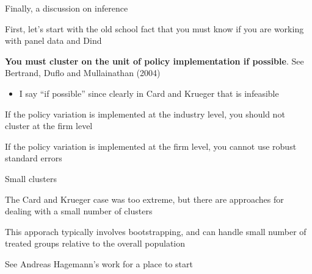 \documentclass[notes,11pt, aspectratio=169]{beamer}
\newenvironment{wideitemize}{\itemize\addtolength{\itemsep}{10pt}}{\enditemize}
\begin{document}
\begin{frame}{Finally, a discussion on inference}
  \begin{wideitemize}
  \item First, let's start with the old school fact that you must know if you are working with panel data and Dind
  \item \textbf{You must cluster on the unit of policy implementation if possible}. See Bertrand, Duflo and Mullainathan (2004)
    \begin{itemize}
    \item I say ``if possible'' since clearly in Card and Krueger that
      is infeasible
    \end{itemize}
  \item If the policy variation is implemented at the industry level, you should not cluster at the firm level
  \item If the policy variation is implemented at the firm level, you
    cannot use robust standard errors
  \end{wideitemize}
\end{frame}

\begin{frame}{Small clusters}
  \begin{wideitemize}
  \item The Card and Krueger case was too extreme, but there are approaches for dealing with a small number of clusters
  \item This apporach typically involves  bootstrapping, and can handle small number of treated groups relative to the overall population
  \item See Andreas Hagemann's work for a place to start
  \end{wideitemize}
\end{frame}
\end{document}
